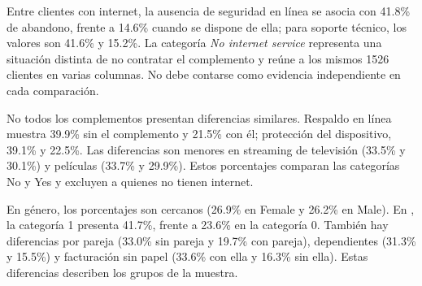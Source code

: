 Entre clientes con internet, la ausencia de seguridad en línea se asocia con 41.8\% de abandono, frente a 
14.6\% cuando se dispone de ella; para soporte técnico, los valores son 41.6\% y 15.2\%. La categoría 
\emph{No internet service} representa una situación distinta de no contratar el complemento y reúne a los 
mismos 1526 clientes en varias columnas. No debe contarse como evidencia independiente en cada comparación.

No todos los complementos presentan diferencias similares. Respaldo en línea muestra 39.9\% sin el 
complemento y 21.5\% con él; protección del dispositivo, 39.1\% y 22.5\%. Las diferencias son menores en 
streaming de televisión (33.5\% y 30.1\%) y películas (33.7\% y 29.9\%). Estos porcentajes comparan las 
categorías No y Yes y excluyen a quienes no tienen internet.

En género, los porcentajes son cercanos (26.9\% en Female y 26.2\% en Male). En , 
la categoría 1 presenta 41.7\%, frente a 23.6\% en la categoría 0. También hay diferencias por pareja 
(33.0\% sin pareja y 19.7\% con pareja), dependientes (31.3\% y 15.5\%) y facturación sin papel 
(33.6\% con ella y 16.3\% sin ella). Estas diferencias describen los grupos de la muestra. 
